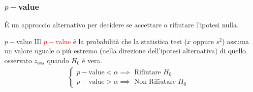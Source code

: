 \documentclass{article}  %
\theoremstyle{definition}
\begin{document}
\subsubsection{$p-$value}
È un approccio alternativo per decidere se accettare o rifiutare l'ipotesi nulla.
\begin{theorem}{$p-$value}
	IIl \textcolor{red}{$p-$value} è la probabilità che la statistica test ($\overline{x}$ oppure $s^2$) assuma un valore uguale o più estremo (nella direzione dell'ipotesi alternativa) di quello
	osservato $z_{oss}$ quando $H_0$ è vera.
	\begin{align*}
		\begin{cases}
			p-\text{value} < \alpha \implies \text{ Rifiutare } H_0 \\
			p-\text{value} > \alpha \implies \text{ Non Rifiutare } H_0
		\end{cases}
	\end{align*}
\end{theorem}
\end{document}
